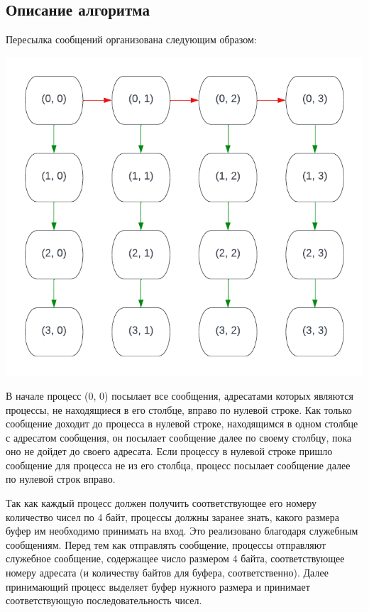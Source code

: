 \documentclass[a4paper,12pt,titlepage,finall]{article}
\begin{document}
\subsection{Описание алгоритма}

Пересылка сообщений организована следующим образом:
\begin{center}
    \includegraphics[scale=1.5, width=\linewidth]{p_matrix.pdf}
\end{center}

В начале процесс (0, 0) посылает все сообщения, адресатами которых являются
процессы, не находящиеся в его столбце, вправо по нулевой строке. Как только сообщение
доходит до процесса в нулевой строке, находящимся в одном столбце с адресатом
сообщения, он посылает сообщение далее по своему столбцу, пока оно не дойдет до
своего адресата. Если процессу в нулевой строке пришло сообщение для процесса не
из его столбца, процесс посылает сообщение далее по нулевой строк вправо.

Так как каждый процесс должен получить соответствующее его номеру количество
чисел по 4 байт, процессы должны заранее знать, какого размера буфер им
необходимо принимать на вход. Это реализовано благодаря служебным сообщениям.
Перед тем как отправлять сообщение, процессы отправляют служебное сообщение,
содержащее число размером 4 байта, соответствующее номеру адресата (и количеству
байтов для буфера, соответственно). Далее принимающий процесс выделяет буфер
нужного размера и принимает соответствующую последовательность чисел.
\end{document}

